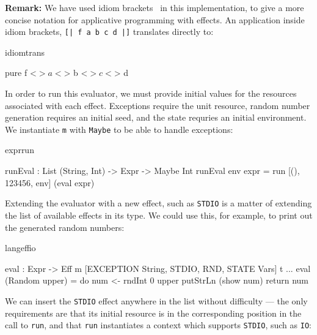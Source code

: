 
\noindent
\textbf{Remark:}
We have used idiom brackets~\cite{McBride2007} in this implementation, to
give a more concise notation for applicative programming with effects.
An application inside idiom brackets, \texttt{[| f a b c d |]} translates
directly to:

\begin{SaveVerbatim}{idiomtrans}

pure f <$> a <$> b <$> c <$> d

\end{SaveVerbatim}

\noindent
In order to run this evaluator, we must provide initial values for the resources
associated with each effect. Exceptions require the unit resource, random
number generation requires an initial seed, and the state requries an initial
environment. We instantiate \texttt{m} with \texttt{Maybe} to be able
to handle exceptions:

\begin{SaveVerbatim}{exprrun}

runEval : List (String, Int) -> Expr -> Maybe Int
runEval env expr = run [(), 123456, env] (eval expr)

\end{SaveVerbatim}

\noindent
Extending the evaluator with a new effect, such as \texttt{STDIO} is a matter
of extending the list of available effects in its type.  We could use this, for
example, to print out the generated random numbers:

\begin{SaveVerbatim}{langeffio}

eval : Expr -> 
       Eff m [EXCEPTION String, STDIO, 
              RND, STATE Vars] t
...
eval (Random upper) = do num <- rndInt 0 upper
                         putStrLn (show num)
                         return num

\end{SaveVerbatim}

\noindent
We can insert the \texttt{STDIO} effect anywhere in the list without difficulty
--- the only requirements are that its initial resource is in the corresponding
position in the call to \texttt{run}, and that \texttt{run} instantiates
a context which supports \texttt{STDIO}, such as \texttt{IO}:

